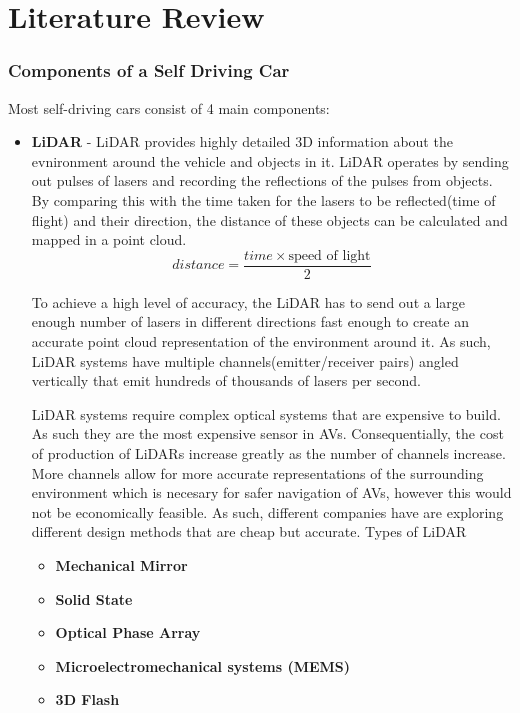 \let\textcircled=\pgftextcircled



\chapter{Literature Review}
\label{chap:lit_review}

\subsection{Components of a Self Driving Car}

Most self-driving cars consist of 4 main components: 
\begin{itemize}
	\item \textbf{LiDAR} - LiDAR provides highly detailed 3D information about the evnironment around the vehicle and objects in it. LiDAR operates by sending out pulses of lasers and recording the reflections of the pulses from objects. By comparing this with the time taken for the lasers to be reflected(time of flight) and their direction, the distance of these objects can be calculated and mapped in a point cloud. 
	\begin{equation*}
	distance = \frac{time \times \text{speed of light}}{2}
	\end{equation*}
	
	To achieve a high level of accuracy, the LiDAR has to send out a large enough number of lasers in different directions fast enough to create an accurate point cloud representation of the environment around it. As such, LiDAR systems have multiple channels(emitter/receiver pairs) angled vertically that  emit hundreds of thousands of lasers per second.
	
	LiDAR systems require complex optical systems that are expensive to build. As such they are the most expensive sensor in AVs. Consequentially, the cost of production of LiDARs increase greatly as the number of channels increase. More channels allow for more accurate representations of the surrounding environment which is necesary for safer navigation of AVs, however this would not be economically feasible. 
	As such, different companies have are exploring different design methods that are cheap but accurate. 
	Types of LiDAR
	\begin{itemize}
		\item \textbf{Mechanical Mirror}
		\item \textbf{Solid State}
		\item \textbf{Optical Phase Array}
		\item \textbf{Microelectromechanical systems (MEMS)}
		\item \textbf{3D Flash}
	\end{itemize}
	

\end{itemize}
